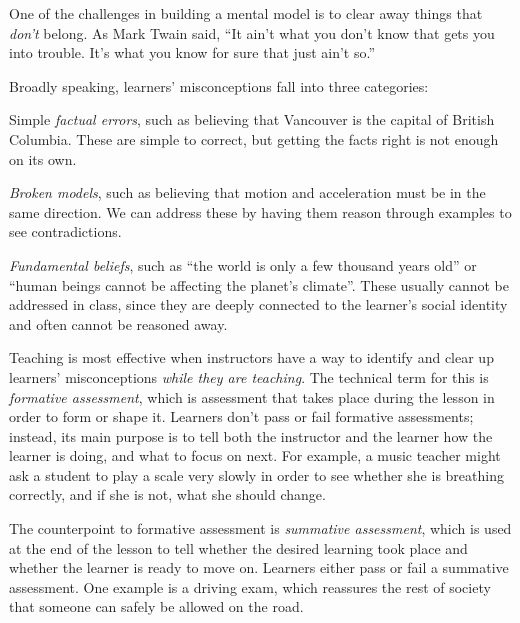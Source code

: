 One of the challenges in building a mental model is to clear away
things that \emph{don't} belong.  As Mark Twain said, ``It ain't what
you don't know that gets you into trouble. It's what you know for sure
that just ain't so.''

Broadly speaking, learners' misconceptions fall into three categories:

\begin{gitemize}

\item
  Simple \emph{factual errors}, such as believing that Vancouver is
  the capital of British Columbia. These are simple to correct, but
  getting the facts right is not enough on its own.

\item
  \emph{Broken models}, such as believing that motion and acceleration
  must be in the same direction. We can address these by having them
  reason through examples to see contradictions.

\item
  \emph{Fundamental beliefs}, such as ``the world is only a few
  thousand years old'' or ``human beings cannot be affecting the
  planet's climate''. These usually cannot be addressed in class,
  since they are deeply connected to the learner's social identity and
  often cannot be reasoned away.

\end{gitemize}

Teaching is most effective when instructors have a way to identify and
clear up learners' misconceptions \emph{while they are teaching}.  The
technical term for this is \emph{formative assessment}, which is
assessment that takes place during the lesson in order to form or
shape it.  Learners don't pass or fail formative assessments; instead,
its main purpose is to tell both the instructor and the learner how
the learner is doing, and what to focus on next.  For example, a music
teacher might ask a student to play a scale very slowly in order to
see whether she is breathing correctly, and if she is not, what she
should change.

The counterpoint to formative assessment is \emph{summative
assessment}, which is used at the end of the lesson to tell whether
the desired learning took place and whether the learner is ready to
move on.  Learners either pass or fail a summative assessment. One
example is a driving exam, which reassures the rest of society that
someone can safely be allowed on the road.

